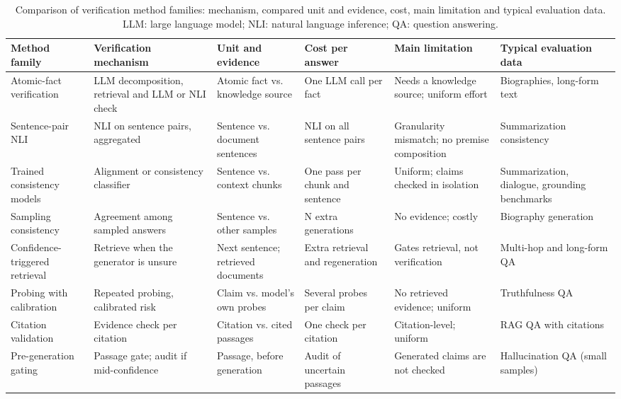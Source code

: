\documentclass[conference]{IEEEtran}
\begin{document}
\begin{table}[t]
\centering
\caption{Comparison of verification method families: mechanism, compared unit and evidence, cost, main limitation and typical evaluation data. LLM: large language model; NLI: natural language inference; QA: question answering.}
\label{tab:t1}
\footnotesize
\setlength{\tabcolsep}{3pt}
\renewcommand{\arraystretch}{1.12}
\begin{tabularx}{\textwidth}{>{\raggedright\arraybackslash\hsize=0.953\hsize}X>{\raggedright\arraybackslash\hsize=1.094\hsize}X>{\raggedright\arraybackslash\hsize=1.059\hsize}X>{\raggedright\arraybackslash\hsize=0.882\hsize}X>{\raggedright\arraybackslash\hsize=1.059\hsize}X>{\raggedright\arraybackslash\hsize=0.953\hsize}X}
\toprule
\textbf{Method family} & \textbf{Verification mechanism} & \textbf{Unit and evidence} & \textbf{Cost per answer} & \textbf{Main limitation} & \textbf{Typical evaluation data} \\
\midrule
Atomic-fact verification & LLM decomposition, retrieval and LLM or NLI check & Atomic fact vs. knowledge source & One LLM call per fact & Needs a knowledge source; uniform effort & Biographies, long-form text \\
Sentence-pair NLI & NLI on sentence pairs, aggregated & Sentence vs. document sentences & NLI on all sentence pairs & Granularity mismatch; no premise composition & Summarization consistency \\
Trained consistency models & Alignment or consistency classifier & Sentence vs. context chunks & One pass per chunk and sentence & Uniform; claims checked in isolation & Summarization, dialogue, grounding benchmarks \\
Sampling consistency & Agreement among sampled answers & Sentence vs. other samples & N extra generations & No evidence; costly & Biography generation \\
Confidence-triggered retrieval & Retrieve when the generator is unsure & Next sentence; retrieved documents & Extra retrieval and regeneration & Gates retrieval, not verification & Multi-hop and long-form QA \\
Probing with calibration & Repeated probing, calibrated risk & Claim vs. model's own probes & Several probes per claim & No retrieved evidence; uniform & Truthfulness QA \\
Citation validation & Evidence check per citation & Citation vs. cited passages & One check per citation & Citation-level; uniform & RAG QA with citations \\
Pre-generation gating & Passage gate; audit if mid-confidence & Passage, before generation & Audit of uncertain passages & Generated claims are not checked & Hallucination QA (small samples) \\

\end{tabularx}
\end{table}
\end{document}
